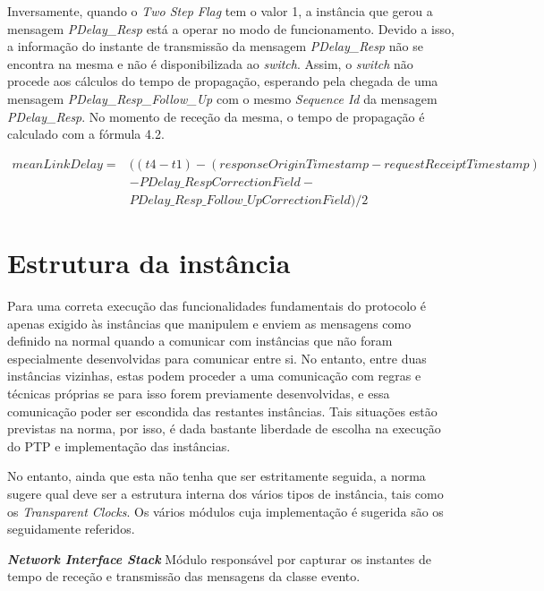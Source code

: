 Inversamente, quando o \textit{Two Step Flag} tem o valor 1, a instância que gerou a mensagem \textit{PDelay\_Resp} está a operar no modo de funcionamento. Devido a isso, a informação do instante de transmissão da mensagem \textit{PDelay\_Resp} não se encontra na mesma e não é disponibilizada ao \textit{switch}. Assim, o \textit{switch} não procede aos cálculos do tempo de propagação, esperando pela chegada de uma mensagem \textit{PDelay\_Resp\_Follow\_Up} com o mesmo \textit{Sequence Id} da mensagem \textit{PDelay\_Resp}. No momento de receção da mesma, o tempo de propagação é calculado com a fórmula 4.2.




    \begin{equation}
    \begin{split}
         meanLinkDelay = & ((t4 - t1) - (responseOriginTimestamp -requestReceiptTimestamp ) \\ & - PDelay\_RespCorrectionField - \\ 
    & PDelay\_Resp\_Follow\_UpCorrectionField) / 2
    \end{split}
    \end{equation}
    

\section{Estrutura da instância}

Para uma correta execução das funcionalidades fundamentais do protocolo é apenas exigido às instâncias que manipulem e enviem as mensagens como definido na normal quando a comunicar com instâncias que não foram especialmente desenvolvidas para comunicar entre si. No entanto, entre duas instâncias vizinhas, estas podem proceder a uma comunicação com regras e técnicas próprias se para isso forem previamente desenvolvidas, e essa comunicação poder ser escondida das restantes instâncias. Tais situações estão previstas na norma, por isso, é dada bastante liberdade de escolha na execução do PTP e implementação das instâncias.\par 
No entanto, ainda que esta não tenha que ser estritamente seguida, a norma sugere qual deve ser a estrutura interna dos vários tipos de instância, tais como os \textit{Transparent Clocks}. Os vários módulos cuja implementação é sugerida são os seguidamente referidos. \par 

\textbf{\textit{Network Interface Stack}} Módulo responsável por capturar os instantes de tempo de receção e transmissão das mensagens da classe evento.

